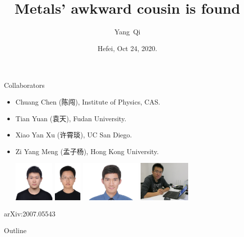 \documentclass[xcolor=table, 10pt, aspectratio=43]{beamer}
\title[EQMC] %
{Metals' awkward cousin is found}
\author[Y Qi] %
{Yang~Qi}
\institute[Fudan] %
{
Department of Physics, Fudan University.
}
\date{Hefei, Oct 24, 2020.}
\begin{document}
\begin{frame}
  \titlepage
\end{frame}

\begin{frame}{Collaborators}
\begin{itemize}
\item Chuang Chen (陈闯), Institute of Physics, CAS.
\item Tian Yuan (袁天), Fudan University.
\item Xiao Yan Xu (许霄琰), UC San Diego.
\item Zi Yang Meng (孟子杨), Hong Kong University.
\begin{center}
  \includegraphics[height=2cm]{../people/chuangchen}
  \includegraphics[height=2cm]{../people/tianyuan}
  \includegraphics[height=2cm]{../people/xiaoyanxu}
  \includegraphics[height=2cm]{../people/ziyangmeng}
\end{center}
\end{itemize}
\begin{center}
  \small arXiv:2007.05543
\end{center}
\end{frame}

\begin{frame}{Outline}
		\tableofcontents
\end{frame}
\end{document}
